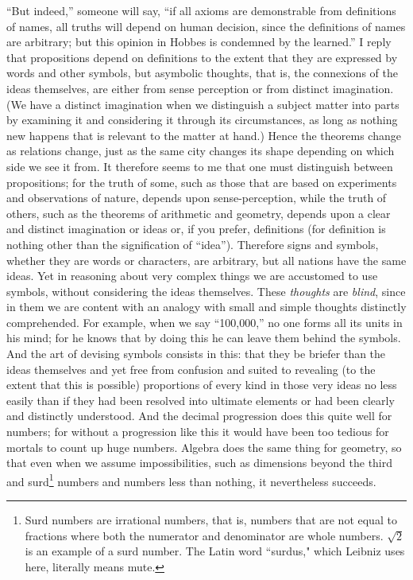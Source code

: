 \documentclass[polutonikogreek,english,twoside,openright]{article}
\begin{document}
``But indeed,'' someone will say, ``if all axioms are demonstrable from
definitions of names, all truths will depend on human decision, since the
definitions of names are arbitrary; but this opinion in Hobbes is condemned by
the learned.''  I reply that propositions depend on definitions to the extent
that they are expressed by words and other symbols, but asymbolic thoughts,
that is, the connexions of the ideas themselves, are either from sense
perception or from distinct imagination.  (We have a distinct imagination when
we distinguish a subject matter into parts by examining it and considering it
through its circumstances, as long as nothing new happens that is relevant to
the matter at hand.)  Hence the theorems change as relations change, just as
the same city changes its shape depending on which side we see it from.  It
therefore seems to me that one must distinguish between propositions; for the
truth of some, such as those that are based on experiments and observations of
nature, depends upon sense-perception, while the truth of others, such as the
theorems of arithmetic and geometry, depends upon a clear and distinct
imagination or ideas or, if you prefer, definitions (for definition is nothing
other than the signification of ``idea'').  Therefore signs and symbols,
whether they are words or characters, are arbitrary, but all nations have the
same ideas.  Yet in reasoning about very complex things we are accustomed to
use symbols, without considering the ideas themselves.  These {\em thoughts}
are {\em blind}, since in them we are content with an analogy with small and
simple thoughts distinctly comprehended.  For example, when we say
``100,000,'' no one forms all its units in his mind; for he knows that by
doing this he can leave them behind the symbols.  And the art of devising
symbols consists in this: that they be briefer than the ideas themselves and
yet free from confusion and suited to revealing (to the extent that this is
possible) proportions of every kind in those very ideas no less easily than if
they had been resolved into ultimate elements or had been clearly and
distinctly understood.  And the decimal progression does this quite well for
numbers; for without a progression like this it would have been too tedious
for mortals to count up huge numbers.  Algebra does the same thing for
geometry, so that even when we assume impossibilities, such as dimensions
beyond the third and surd\footnote{Surd numbers are irrational numbers, that is, numbers that are not equal to fractions where both the numerator and denominator are whole numbers.  $\sqrt{2}$ is an example of a surd number.  The Latin word ``surdus," which Leibniz uses here, literally means mute.} numbers and numbers less than nothing, it
nevertheless succeeds.
\end{document}
